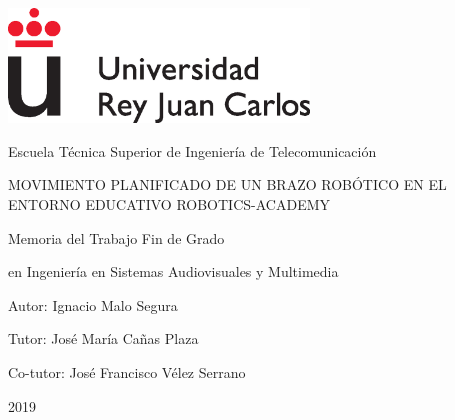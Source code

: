 \documentclass[12pt,spanish,chapterprefix, numbers=noenddot]{book}
\numberwithin{equation}{section}
\numberwithin{figure}{section}
\begin{document}
\frontmatter

\begin{titlepage}

\begin{center}
\includegraphics[width=8cm]{Figs/logoURJC}
\par\end{center}

\begin{center}
Escuela Técnica Superior de Ingeniería de Telecomunicación
\par\end{center}

\vspace{4cm}

\begin{center}
{\LARGE{}MOVIMIENTO PLANIFICADO DE UN BRAZO ROBÓTICO 
EN EL ENTORNO EDUCATIVO ROBOTICS-ACADEMY}{\LARGE\par}
\par\end{center}

\vspace{4cm}

\begin{center}
{\large{}Memoria del Trabajo Fin de Grado}{\large\par}
\par\end{center}

\begin{center}
{\large{}en Ingeniería en Sistemas Audiovisuales y Multimedia}{\large\par}
\par\end{center}

\vspace{4cm}

\begin{center}
{\large{}Autor: Ignacio Malo Segura}{\large\par}
\par\end{center}

\begin{center}
{\large{}Tutor: José María Cañas Plaza}{\large\par}
\par\end{center}

\begin{center}
{\large{}Co-tutor: José Francisco Vélez Serrano}{\large\par}
\par\end{center}

\begin{center}
2019
\par\end{center}

\end{titlepage}
\end{document}
